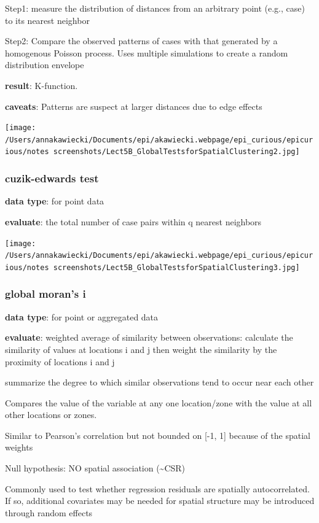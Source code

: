\documentclass[
]{article}
\begin{document}
Step1: measure the distribution of distances from an arbitrary point
(e.g., case) to its nearest neighbor

Step2: Compare the observed patterns of cases with that generated by a
homogenous Poisson process. Uses multiple simulations to create a random
distribution envelope

\textbf{result}: K-function.

\textbf{caveats}: Patterns are suspect at larger distances due to edge
effects

\texttt{[image: /Users/annakawiecki/Documents/epi/akawiecki.webpage/epi\_curious/epicurious/notes screenshots/Lect5B\_GlobalTestsforSpatialClustering2.jpg]}

\hypertarget{cuzik-edwards-test}{%
\subsubsection{cuzik-edwards test}\label{cuzik-edwards-test}}

\textbf{data type}: for point data

\textbf{evaluate}: the total number of case pairs within q nearest
neighbors

\texttt{[image: /Users/annakawiecki/Documents/epi/akawiecki.webpage/epi\_curious/epicurious/notes screenshots/Lect5B\_GlobalTestsforSpatialClustering3.jpg]}

\hypertarget{global-morans-i}{%
\subsubsection{global moran's i}\label{global-morans-i}}

\textbf{data type}: for point or aggregated data

\textbf{evaluate}: weighted average of similarity between observations:
calculate the similarity of values at locations i and j then weight the
similarity by the proximity of locations i and j

summarize the degree to which similar observations tend to occur near
each other

Compares the value of the variable at any one location/zone with the
value at all other locations or zones.

Similar to Pearson's correlation but not bounded on {[}-1, 1{]} because
of the spatial weights

Null hypothesis: NO spatial association (\textasciitilde CSR)

Commonly used to test whether regression residuals are spatially
autocorrelated. If so, additional covariates may be needed for spatial
structure may be introduced through random effects
\end{document}
